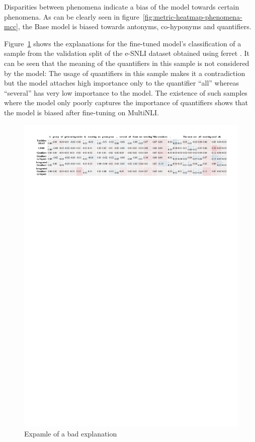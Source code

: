 Disparities between phenomena indicate a bias of the model towards certain phenomena. As can be clearly seen in figure~\ref{fig:metric-heatmap-phenomena-mcc}, the Base model is biased towards antonyms, co-hyponyms and quantifiers.

Figure~\ref{fig:ferret-sample} shows the explanations for the fine-tuned model's classification of a sample from the validation split of the \ac{e-SNLI} dataset obtained using ferret \cite{ferret}. It can be seen that the meaning of the quantifiers in this sample is not considered by the model: The usage of quantifiers in this sample makes it a contradiction but the model attaches high importance only to the quantifier \enquote{all} whereas \enquote{several} has very low importance to the model. The existence of such samples where the model only poorly captures the importance of quantifiers shows that the model is biased after fine-tuning on \ac{MultiNLI}.

\begin{figure}[h!]
    \centering
    \includegraphics[width=\textwidth]{./images/ferret_sample.pdf}
    \caption{Expamle of a bad explanation}
    \label{fig:ferret-sample}
\end{figure}

